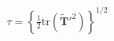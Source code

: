 \documentclass[preview]{standalone}
\begin{document}
\begin{align*}
\tau = \left\{ \frac{1}{2} \text{tr}(\tilde{\mathbf{T}}'^2) \right\}^{1/2}
\end{align*}
\end{document}
